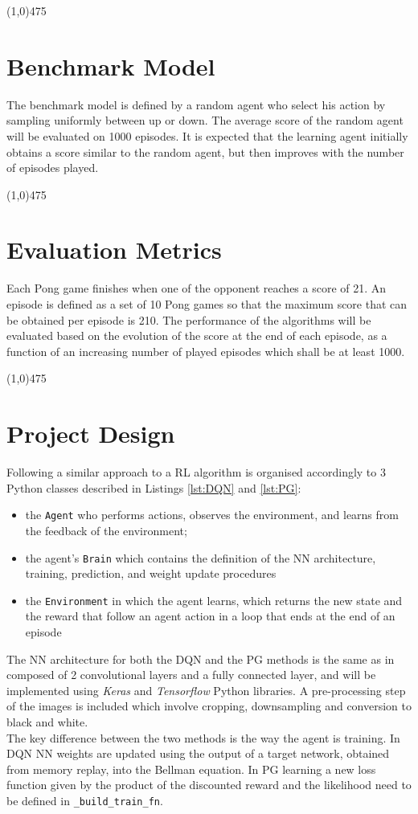 \documentclass[a4paper, 11pt]{article}
\newcommand{\hl}{\begin{center} \line(1,0){475} \end{center}} %
\begin{document}
\hl

\section*{Benchmark Model}

The benchmark model is defined by a random agent who select his action by sampling uniformly between up or down. The average score of the random agent will be evaluated on 1000 episodes. It is expected that the learning agent initially obtains a score similar to the random agent, but then improves with the number of episodes played.  

\hl

\section*{Evaluation Metrics}

Each Pong game finishes when one of the opponent reaches a score of 21. An episode is defined as a set of 10 Pong games so that the maximum score that can be obtained per episode is 210. The performance of the algorithms will be evaluated based on the evolution of the score at the end of each episode, as a function of an increasing number of played episodes which shall be at least 1000. 

\hl

\section*{Project Design}

Following a similar approach to \cite{Jaromiru} a RL algorithm is organised accordingly to 3 Python classes described in Listings \ref{lst:DQN} and \ref{lst:PG}: 
\begin{itemize}
\item the \texttt{Agent} who performs actions, observes the environment, and learns from the feedback of the environment;
\item the agent's \texttt{Brain} which contains the definition of the NN architecture, training, prediction, and weight update procedures
\item the \texttt{Environment} in which the agent learns, which returns the new state and the reward that follow an agent action in a loop that ends at the end of an episode
\end{itemize}
The NN architecture for both the DQN and the PG methods is the same as in \cite{Mnih2013} composed of 2 convolutional layers and a fully connected layer, and will be implemented using \emph{Keras} and \emph{Tensorflow} Python libraries. A pre-processing step of the images is included which involve cropping, downsampling and conversion to black and white.\\
The key difference between the two methods is the way the agent is training. In DQN NN weights are updated using the output of a target network, obtained from memory replay, into the Bellman equation. In PG learning a new loss function given by the product of the discounted reward and the likelihood need to be defined in \texttt{\_build\_train\_fn}.
\end{document}
